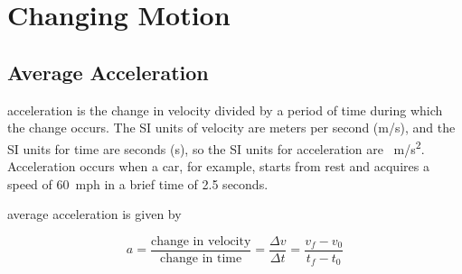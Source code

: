 \documentclass[main-physics.tex]{subfiles}
\begin{document}
\section{Changing Motion}

\subsection{Average Acceleration}


\Gls{acceleration} is the change in velocity divided by a period of time during which the change occurs. The SI units of velocity are meters per second (m/s), and the SI units for time are seconds (s), so the SI units for acceleration are \SI{}{m/s^2}. Acceleration occurs when a car, for example, starts from rest and acquires a speed of \SI{60}{mph} in a brief time of 2.5 seconds. 

\begin{center}
\end{center}

\vspace{1em}

\Gls{average acceleration} is given by

\begin{equation} \label{33EGTg}
    a = \frac{\text{change in velocity}}{\text{change in time}} = \frac{\Delta{v}}{\Delta{t}} = \frac{v_f - v_0}{t_f - t_0}
\end{equation}
\end{document}

